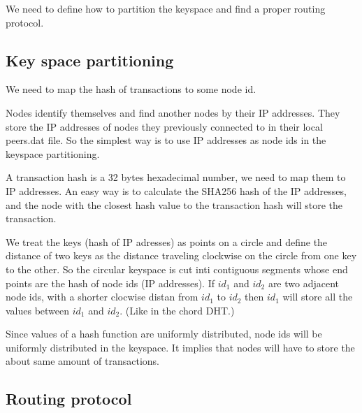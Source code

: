 \documentclass[a4paper,12pt]{article}
\begin{document}
We need to define how to partition the keyspace and find a proper routing protocol.


\subsection{Key space partitioning}

We need to map the hash of transactions to some node id.

Nodes identify themselves and find another nodes by their IP addresses. They store the IP addresses of nodes they previously connected to in their local peers.dat file. So the simplest way is to use IP addresses as node ids in the keyspace partitioning.

A transaction hash is a 32 bytes hexadecimal number, we need to map them to IP addresses. An easy way is to calculate the SHA256 hash of the IP addresses, and the node with the closest hash value to the transaction hash will store the transaction.

We treat the keys (hash of IP adresses) as points on a circle and define the distance of two keys as the distance traveling clockwise on the circle from one key to the other. So the circular keyspace is cut inti contiguous segments whose end points are the hash of node ids (IP addresses). If $id_1$ and $id_2$ are two adjacent node ids, with a shorter clocwise distan from $id_1$ to $id_2$ then $id_1$ will store all the values between $id_1$ and $id_2$. (Like in the chord DHT.)

Since values of a hash function are uniformly distributed, node ids will be uniformly distributed in the keyspace. It implies that nodes will have to store the about same amount of transactions.






\subsection{Routing protocol}
\end{document}
